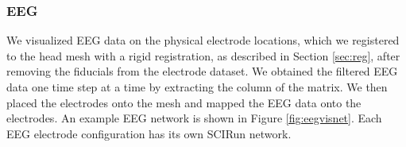 \subsubsection{EEG}

We visualized EEG data on the physical electrode locations, which we registered to the head mesh with a rigid registration, as described in Section \ref{sec:reg}, after removing the fiducials from the electrode dataset. We obtained the filtered EEG data one time step at a time by extracting the column of the matrix. We then placed the electrodes onto the mesh and mapped the EEG data onto the electrodes. An example EEG network is shown in Figure \ref{fig:eegvisnet}. Each EEG electrode configuration has its own SCIRun network.

